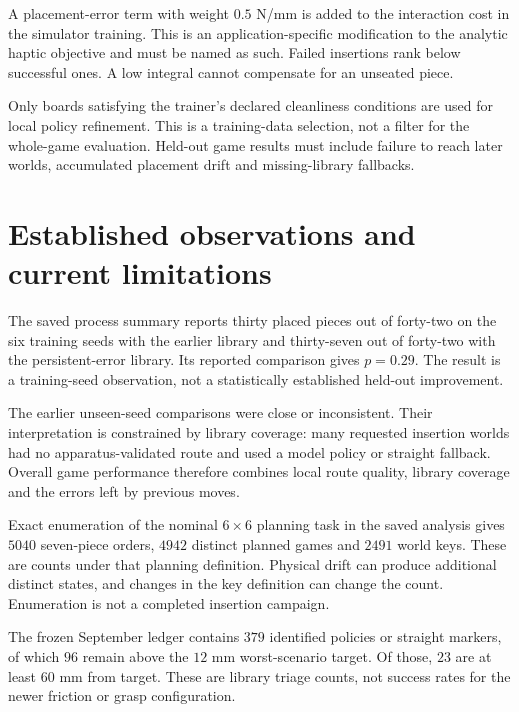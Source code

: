 A placement-error term with weight $0.5$ N/mm is added to the interaction cost in the simulator training. This is an application-specific modification to the analytic haptic objective and must be named as such. Failed insertions rank below successful ones. A low integral cannot compensate for an unseated piece.

Only boards satisfying the trainer's declared cleanliness conditions are used for local policy refinement. This is a training-data selection, not a filter for the whole-game evaluation. Held-out game results must include failure to reach later worlds, accumulated placement drift and missing-library fallbacks.

\section{Established observations and current limitations}

The saved process summary reports thirty placed pieces out of forty-two on the six training seeds with the earlier library and thirty-seven out of forty-two with the persistent-error library. Its reported comparison gives $p=0.29$. The result is a training-seed observation, not a statistically established held-out improvement.

The earlier unseen-seed comparisons were close or inconsistent. Their interpretation is constrained by library coverage: many requested insertion worlds had no apparatus-validated route and used a model policy or straight fallback. Overall game performance therefore combines local route quality, library coverage and the errors left by previous moves.

Exact enumeration of the nominal $6\times6$ planning task in the saved analysis gives $5040$ seven-piece orders, $4942$ distinct planned games and $2491$ world keys. These are counts under that planning definition. Physical drift can produce additional distinct states, and changes in the key definition can change the count. Enumeration is not a completed insertion campaign.

The frozen September ledger contains $379$ identified policies or straight markers, of which $96$ remain above the $12$ mm worst-scenario target. Of those, $23$ are at least $60$ mm from target. These are library triage counts, not success rates for the newer friction or grasp configuration.



